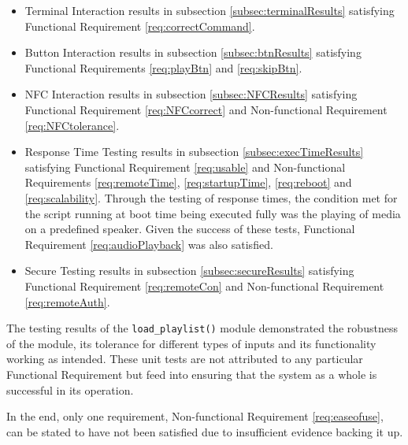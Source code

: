 \begin{itemize}
    \item Terminal Interaction results in subsection \ref{subsec:terminalResults} satisfying Functional Requirement \ref{req:correctCommand}.
    \item Button Interaction results in subsection \ref{subsec:btnResults} satisfying Functional Requirements \ref{req:playBtn} and \ref{req:skipBtn}.
    \item NFC Interaction results in subsection \ref{subsec:NFCResults} satisfying Functional Requirement \ref{req:NFCcorrect} and Non-functional Requirement \ref{req:NFCtolerance}.
    \item Response Time Testing results in subsection \ref{subsec:execTimeResults} satisfying Functional Requirement \ref{req:usable} and Non-functional Requirements \ref{req:remoteTime}, \ref{req:startupTime}, \ref{req:reboot} and \ref{req:scalability}. Through the testing of response times, the condition met for the script running at boot time being executed fully was the playing of media on a predefined speaker. Given the success of these tests, Functional Requirement \ref{req:audioPlayback} was also satisfied.
    \item Secure Testing results in subsection \ref{subsec:secureResults} satisfying Functional Requirement \ref{req:remoteCon} and Non-functional Requirement \ref{req:remoteAuth}.
\end{itemize}

The testing results of the \texttt{load\_playlist()} module demonstrated the robustness of the module, its tolerance for different types of inputs and its functionality working as intended. These unit tests are not attributed to any particular Functional Requirement but feed into ensuring that the system as a whole is successful in its operation.

In the end, only one requirement, Non-functional Requirement \ref{req:easeofuse}, can be stated to have not been satisfied due to insufficient evidence backing it up.

